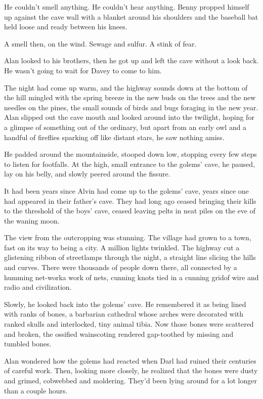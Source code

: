 He couldn't smell anything.  He couldn't hear anything.  Benny propped
himself up against the cave wall with a blanket around his shoulders
and the baseball bat held loose and ready between his knees.

A smell then, on the wind.  Sewage and sulfur.  A stink of fear.

Alan looked to his brothers, then he got up and left the cave without
a look back.  He wasn't going to wait for Davey to come to him.

The night had come up warm, and the highway sounds down at the bottom
of the hill mingled with the spring breeze in the new buds on the
trees and the new needles on the pines, the small sounds of birds and
bugs foraging in the new year.  Alan slipped out the cave mouth and
looked around into the twilight, hoping for a glimpse of something out
of the ordinary, but apart from an early owl and a handful of
fireflies sparking off like distant stars, he saw nothing amiss.

He padded around the mountainside, stooped down low, stopping every
few steps to listen for footfalls.  At the high, small entrance to the
golems' cave, he paused, lay on his belly, and slowly peered around
the fissure.

It had been years since Alvin had come up to the golems' cave, years
since one had appeared in their father's cave.  They had long ago
ceased bringing their kills to the threshold of the boys' cave, ceased
leaving pelts in neat piles on the eve of the waning moon.

The view from the outcropping was stunning.  The village had grown to
a town, fast on its way to being a city.  A million lights twinkled. 
The highway cut a glistening ribbon of streetlamps through the night,
a straight line slicing the hills and curves.  There were thousands of
people down there, all connected by a humming net-work\dash{}a work of
nets, cunning knots tied in a cunning grid\dash{}of wire and radio and
civilization.

Slowly, he looked back into the golems' cave.  He remembered it as
being lined with ranks of bones, a barbarian cathedral whose arches
were decorated with ranked skulls and interlocked, tiny animal tibia. 
Now those bones were scattered and broken, the ossified wainscoting
rendered gap-toothed by missing and tumbled bones.

Alan wondered how the golems had reacted when Darl had ruined their
centuries of careful work.  Then, looking more closely, he realized
that the bones were dusty and grimed, cobwebbed and moldering.  They'd
been lying around for a lot longer than a couple hours.

